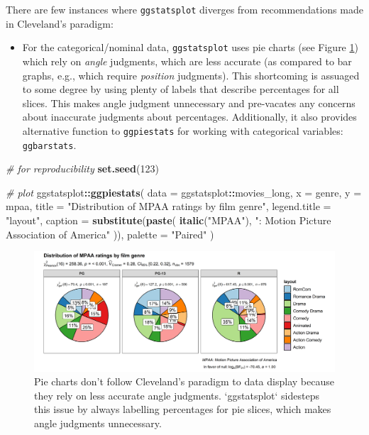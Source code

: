 \documentclass[
]{article}
\newenvironment{Shaded}{\begin{snugshade}}{\end{snugshade}}
\newcommand{\CommentTok}[1]{\textcolor[rgb]{0.56,0.35,0.01}{\textit{#1}}}
\newcommand{\DataTypeTok}[1]{\textcolor[rgb]{0.13,0.29,0.53}{#1}}
\newcommand{\DecValTok}[1]{\textcolor[rgb]{0.00,0.00,0.81}{#1}}
\newcommand{\KeywordTok}[1]{\textcolor[rgb]{0.13,0.29,0.53}{\textbf{#1}}}
\newcommand{\NormalTok}[1]{#1}
\newcommand{\OperatorTok}[1]{\textcolor[rgb]{0.81,0.36,0.00}{\textbf{#1}}}
\newcommand{\StringTok}[1]{\textcolor[rgb]{0.31,0.60,0.02}{#1}}
\providecommand{\tightlist}{%
  \setlength{\itemsep}{0pt}\setlength{\parskip}{0pt}}
\begin{document}
There are few instances where \texttt{ggstatsplot} diverges from recommendations made
in Cleveland's paradigm:

\begin{itemize}
\tightlist
\item
  For the categorical/nominal data, \texttt{ggstatsplot} uses pie charts (see Figure
  \ref{fig:fig2}) which rely on \emph{angle} judgments, which are less accurate (as
  compared to bar graphs, e.g., which require \emph{position} judgments). This
  shortcoming is assuaged to some degree by using plenty of labels that
  describe percentages for all slices. This makes angle judgment unnecessary
  and pre-vacates any concerns about inaccurate judgments about percentages.
  Additionally, it also provides alternative function to \texttt{ggpiestats} for
  working with categorical variables: \texttt{ggbarstats}.
\end{itemize}

\begin{Shaded}
\begin{Highlighting}[]
\CommentTok{\# for reproducibility}
\KeywordTok{set.seed}\NormalTok{(}\DecValTok{123}\NormalTok{)}

\CommentTok{\# plot}
\NormalTok{ggstatsplot}\OperatorTok{::}\KeywordTok{ggpiestats}\NormalTok{(}
  \DataTypeTok{data =}\NormalTok{ ggstatsplot}\OperatorTok{::}\NormalTok{movies\_long,}
  \DataTypeTok{x =}\NormalTok{ genre,}
  \DataTypeTok{y =}\NormalTok{ mpaa,}
  \DataTypeTok{title =} \StringTok{"Distribution of MPAA ratings by film genre"}\NormalTok{,}
  \DataTypeTok{legend.title =} \StringTok{"layout"}\NormalTok{,}
  \DataTypeTok{caption =} \KeywordTok{substitute}\NormalTok{(}\KeywordTok{paste}\NormalTok{(}
    \KeywordTok{italic}\NormalTok{(}\StringTok{"MPAA"}\NormalTok{), }\StringTok{": Motion Picture Association of America"}
\NormalTok{  )),}
  \DataTypeTok{palette =} \StringTok{"Paired"}
\NormalTok{)}
\end{Highlighting}
\end{Shaded}

\begin{figure}[H]
\includegraphics[width=1\linewidth]{./figures/paper-fig2-1} \caption{Pie charts don't follow Cleveland's paradigm to data display because they rely on less accurate angle judgments. `ggstatsplot` sidesteps this issue by always labelling percentages for pie slices, which makes angle judgments unnecessary.}\label{fig:fig2}
\end{figure}
\end{document}
